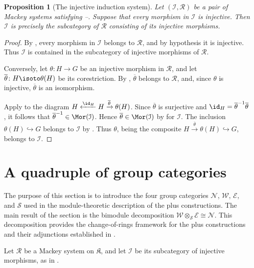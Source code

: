 \documentclass{amsart}
\numberwithin{equation}{section}%
\newtheorem{Prop}[equation]{Proposition}
\theoremstyle{remark}
\theoremstyle{definition}
\newcommand{\e}{\mathcal E}
\newcommand{\s}{\mathcal S}
\newcommand{\n}{\mathcal N}
\newcommand{\w}{\mathcal W}
\newcommand{\ol}[1]{\overline{#1}}
\begin{document}
%
\begin{Prop}[The injective induction system]
\label{prop:injective-induction-forced}
Let $(\mathcal I,\mathcal R)$ be a pair of Mackey systems satisfying
--. Suppose that every morphism in $\mathcal I$ is
injective. Then $\mathcal I$ is precisely the subcategory of
$\mathcal R$ consisting of its injective morphisms.
\end{Prop}
%
\begin{proof}
By , every morphism in $\mathcal I$ belongs to $\mathcal R$,
and by hypothesis it is injective. Thus $\mathcal I$ is contained in
the subcategory of injective morphisms of $\mathcal R$.

Conversely, let $\theta\colon H\to G$ be an injective morphism in
$\mathcal R$, and let
$\ol{\theta}\colon H\isoto\theta(H)$ be its corestriction. By
, $\ol{\theta}$ belongs to $\mathcal R$, and, since $\theta$
is injective, $\ol{\theta}$ is an isomorphism.

Apply  to the diagram
$H\xleftarrow{\id_H}H\xrightarrow{\ol{\theta}}\theta(H)$.
Since $\ol{\theta}$ is surjective and
$\id_H=\ol{\theta}^{-1}\ol{\theta}$, it follows that
$\ol{\theta}^{-1}\in\Mor(\mathcal I)$. Hence
$\ol{\theta}\in\Mor(\mathcal I)$ by  for $\mathcal I$.
The inclusion $\theta(H)\hookrightarrow G$ belongs to
$\mathcal I$ by . Thus
$\theta$, being the composite
$H\xrightarrow{\ol{\theta}}\theta(H)\hookrightarrow G$,
belongs to $\mathcal I$.
\end{proof}
%


%
\section{A quadruple of group categories}
\label{sec:four-group-categories}
%
The purpose of this section is to introduce the four group
categories $\n$, $\w$, $\e$, and $\s$ used in the module-theoretic description of the
plus constructions.  The main result of the section is the bimodule decomposition
$\mathcal W\otimes_{\mathcal S}\mathcal E\cong\mathcal N$.
This decomposition provides the change-of-rings framework
for the plus constructions and their adjunctions
established in .

Let $\mathcal R$ be a Mackey system on $\mathfrak K$, and let
$\mathcal I$ be its subcategory of injective morphisms, as in
.
\end{document}
